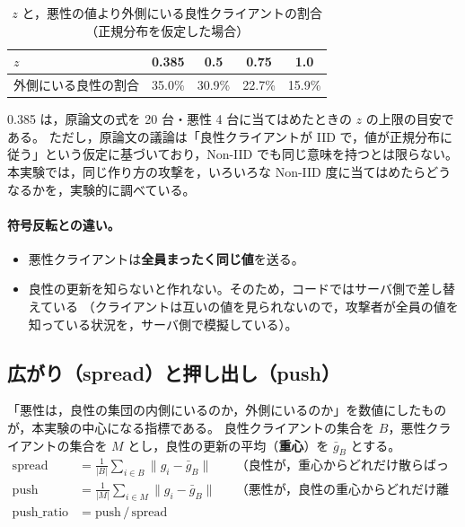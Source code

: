 \documentclass[a4j, dvipdfmx]{jsarticle}  %
\begin{document}
\begin{table}[H]
\centering
\caption{$z$ と，悪性の値より外側にいる良性クライアントの割合（正規分布を仮定した場合）}
\label{tab:z}
\begin{tabular}{@{}lcccc@{}}
\toprule
$z$ & 0.385 & 0.5 & 0.75 & 1.0 \\
\midrule
外側にいる良性の割合 & 35.0\% & 30.9\% & 22.7\% & 15.9\% \\
\bottomrule
\end{tabular}
\end{table}

0.385 は，原論文の式を 20 台・悪性 4 台に当てはめたときの $z$ の上限の目安である。
ただし，原論文の議論は「良性クライアントが IID で，値が正規分布に従う」という仮定に基づいており，Non-IID でも同じ意味を持つとは限らない。
本実験では，同じ作り方の攻撃を，いろいろな Non-IID 度に当てはめたらどうなるかを，実験的に調べている。

\paragraph{符号反転との違い。}
\begin{itemize}
  \item 悪性クライアントは\textbf{全員まったく同じ値}を送る。
  \item 良性の更新を知らないと作れない。そのため，コードではサーバ側で差し替えている
        （クライアントは互いの値を見られないので，攻撃者が全員の値を知っている状況を，サーバ側で模擬している）。
\end{itemize}

\subsection{広がり（spread）と押し出し（push）}
\label{sec:spread}

「悪性は，良性の集団の内側にいるのか，外側にいるのか」を数値にしたものが，本実験の中心になる指標である。
良性クライアントの集合を $B$，悪性クライアントの集合を $M$ とし，良性の更新の平均（\textbf{重心}）を $\bar{g}_B$ とする。
\begin{align}
  \mathrm{spread} &= \frac{1}{|B|} \sum_{i \in B} \| g_i - \bar{g}_B \| && \text{（良性が，重心からどれだけ散らばっているか）} \\
  \mathrm{push}   &= \frac{1}{|M|} \sum_{i \in M} \| g_i - \bar{g}_B \| && \text{（悪性が，良性の重心からどれだけ離れているか）} \\
  \mathrm{push\_ratio} &= \mathrm{push} \,/\, \mathrm{spread}
\end{align}
\end{document}
